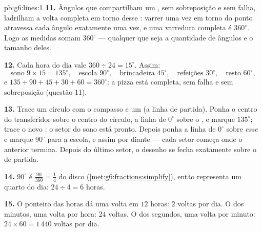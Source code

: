 \begin{solution}{pb:g6:lines:1}
\textbf{11.} Ângulos que compartilham um , sem sobreposição e
sem falha, ladrilham a volta completa em torno desse : varrer
uma vez em torno do ponto atravessa cada ângulo exatamente uma vez, e
uma varredura completa é $360^\circ$. Logo as medidas somam $360^\circ$
--- qualquer que seja a quantidade de ângulos e o tamanho deles.

\textbf{12.} Cada hora do dia vale $360 \div 24 = 15^\circ$. Assim:
\[
\text{sono } 9 \times 15 = 135^\circ, \quad
\text{escola } 90^\circ, \quad
\text{brincadeira } 45^\circ, \quad
\text{refeições } 30^\circ, \quad
\text{resto } 60^\circ,
\]
e $135 + 90 + 45 + 30 + 60 = 360^\circ$: a pizza está completa, sem
falha e sem sobreposição (questão 11).

\textbf{13.} Trace um círculo com o compasso e um  (a linha de
partida). Ponha o centro do transferidor sobre o centro do círculo, a
linha de $0^\circ$ sobre o , e marque $135^\circ$; trace o novo
: o setor do sono está pronto. Depois ponha a linha de $0^\circ$
sobre \emph{esse}  e marque $90^\circ$ para a escola, e assim por
diante --- cada setor começa onde o anterior termina. Depois do último
setor, o desenho se fecha exatamente sobre o  de partida.

\textbf{14.} $90^\circ$ é $\frac{90}{360} = \frac14$ do disco
(\cref{met:g6:fractions:simplify}), então representa um quarto do dia:
$24 \div 4 = 6$ horas.

\textbf{15.} O ponteiro das horas dá uma volta em $12$ horas: $2$
voltas por dia. O dos minutos, uma volta por hora: $24$ voltas. O dos
segundos, uma volta por minuto: $24 \times 60 = 1\,440$ voltas por
dia.
\end{solution}

